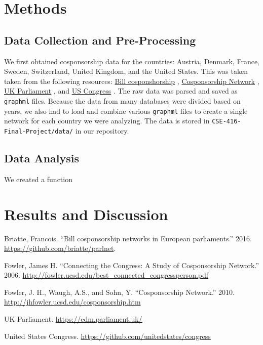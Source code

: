 \documentclass[12pt]{article}
\begin{document}
\section{Methods}

\subsection{Data Collection and Pre-Processing}
We first obtained cosponsorship data for the countries: Austria, Denmark, France, Sweden, Switzerland, United Kingdom, and the United States. This was taken taken from the following resources: \underline{Bill cosponshorship} \cite{briatte}, \underline{Cosponsorship Network} \cite{fowler}, \underline{UK Parliament} \cite{UK}, and \underline{US Congress} \cite{US}. The raw data was parsed and saved as \texttt{graphml} files. Because the data from many databases were divided based on years, we also had to load and combine various \texttt{graphml} files to create a single network for each country we were analyzing. The data is stored in \texttt{CSE-416-Final-Project/data/} in our repository.

\subsection{Data Analysis}
We created a function 

\section{Results and Discussion}

\newpage
\begin{thebibliography}{9}

 Briatte, Francois. ``Bill cosponsorship networks in European parliaments.'' 2016. \url{https://github.com/briatte/parlnet}.

 Fowler, James H. ``Connecting the Congress: A Study of Cosponsorship Network.'' 2006. \url{http://fowler.ucsd.edu/best_connected_congressperson.pdf}

 Fowler, J. H., Waugh, A.S., and Sohn, Y. ``Cosponsorship Network.'' 2010. \url {http://jhfowler.ucsd.edu/cosponsorship.htm}

 UK Parliament. \url{https://edm.parliament.uk/}

 United States Congress. \url{https://github.com/unitedstates/congress}
\end{thebibliography}
\end{document}
